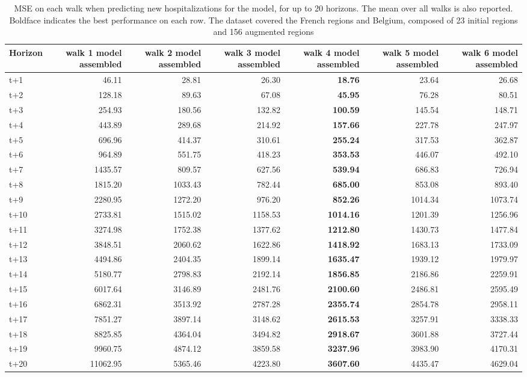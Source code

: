 \begin{table}[H]
\centering
\caption{MSE on each walk when predicting new hospitalizations for the model, for up to 20 horizons. The mean over all walks is also reported. Boldface indicates the best performance on each row. The dataset covered the French regions and Belgium, composed of 23 initial regions and 156 augmented regions }
\label{tab:MSE_walk_assembly}
\begin{tabular}{lrrrrrr}
\toprule
Horizon &  walk 1 model assembled &  walk 2 model assembled &  walk 3 model assembled &  walk 4 model assembled &  walk 5 model assembled &  walk 6 model assembled \\
\midrule
t+1  & 46.11  & 28.81  & 26.30  & \textbf{18.76}  & 23.64  & 26.68  \\
t+2  & 128.18  & 89.63  & 67.08  & \textbf{45.95}  & 76.28  & 80.51  \\
t+3  & 254.93  & 180.56  & 132.82  & \textbf{100.59}  & 145.54  & 148.71  \\
t+4  & 443.89  & 289.68  & 214.92  & \textbf{157.66}  & 227.78  & 247.97  \\
t+5  & 696.96  & 414.37  & 310.61  & \textbf{255.24}  & 317.53  & 362.87  \\
t+6  & 964.89  & 551.75  & 418.23  & \textbf{353.53}  & 446.07  & 492.10  \\
t+7  & 1435.57  & 809.57  & 627.56  & \textbf{539.94}  & 686.83  & 726.94  \\
t+8  & 1815.20  & 1033.43  & 782.44  & \textbf{685.00}  & 853.08  & 893.40  \\
t+9  & 2280.95  & 1272.20  & 976.20  & \textbf{852.26}  & 1014.34  & 1073.74  \\
t+10  & 2733.81  & 1515.02  & 1158.53  & \textbf{1014.16}  & 1201.39  & 1256.96  \\
t+11  & 3274.98  & 1752.38  & 1377.62  & \textbf{1212.80}  & 1430.73  & 1477.84  \\
t+12  & 3848.51  & 2060.62  & 1622.86  & \textbf{1418.92}  & 1683.13  & 1733.09  \\
t+13  & 4494.86  & 2404.35  & 1899.14  & \textbf{1635.47}  & 1939.12  & 1979.97  \\
t+14  & 5180.77  & 2798.83  & 2192.14  & \textbf{1856.85}  & 2186.86  & 2259.91  \\
t+15  & 6017.64  & 3146.89  & 2481.76  & \textbf{2100.60}  & 2486.81  & 2595.49  \\
t+16  & 6862.31  & 3513.92  & 2787.28  & \textbf{2355.74}  & 2854.78  & 2958.11  \\
t+17  & 7851.27  & 3897.14  & 3148.62  & \textbf{2615.53}  & 3257.91  & 3338.33  \\
t+18  & 8825.85  & 4364.04  & 3494.82  & \textbf{2918.67}  & 3601.88  & 3727.44  \\
t+19  & 9960.75  & 4874.12  & 3859.58  & \textbf{3237.96}  & 3983.90  & 4170.31  \\
t+20  & 11062.95  & 5365.46  & 4223.80  & \textbf{3607.60}  & 4435.47  & 4629.04  \\

\bottomrule
\end{tabular}
\end{table}
